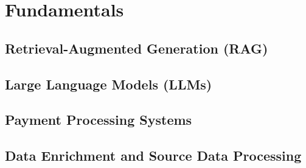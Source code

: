 \chapter{Fundamentals}
\label{ch:fundamentals}

\section{Retrieval-Augmented Generation (RAG)}
\label{sec:rag}


\section{Large Language Models (LLMs)}
\label{sec:llms}


\section{Payment Processing Systems}
\label{sec:payment-systems}


\section{Data Enrichment and Source Data Processing}
\label{sec:data-enrichment}

